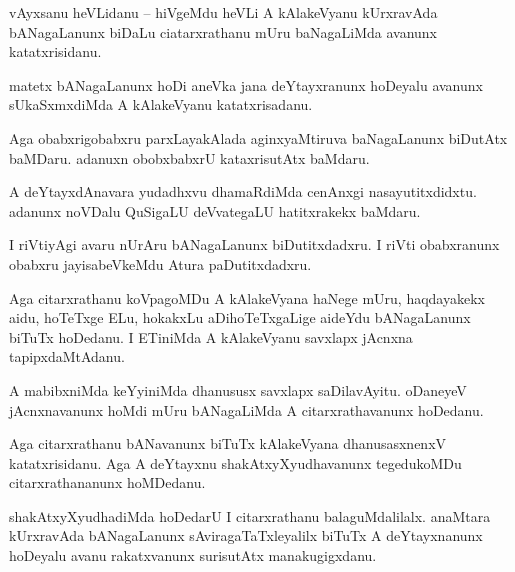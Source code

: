 \documentclass{article}
\begin{document}
\begin{mng}%
vAyxsanu heVLidanu -- hiVgeMdu heVLi A kAlakeVyanu kUrxravAda bANagaLanunx biDaLu ciatarxrathanu 
mUru baNagaLiMda avanunx katatxrisidanu.
\end{mng}

\begin{mng}%
matetx bANagaLanunx hoDi aneVka jana deYtayxranunx hoDeyalu avanunx sUkaSxmxdiMda A kAlakeVyanu 
katatxrisadanu.
\end{mng}

\begin{mng}%
Aga obabxrigobabxru parxLayakAlada aginxyaMtiruva baNagaLanunx biDutAtx baMDaru. adanuxn 
obobxbabxrU kataxrisutAtx baMdaru.
\end{mng}

\begin{mng}%
A deYtayxdAnavara yudadhxvu dhamaRdiMda cenAnxgi nasayutitxdidxtu. adanunx noVDalu QuSigaLU 
deVvategaLU hatitxrakekx baMdaru.
\end{mng}

\begin{mng}%
I riVtiyAgi  avaru nUrAru bANagaLanunx biDutitxdadxru. I riVti obabxranunx obabxru jayisabeVkeMdu 
Atura paDutitxdadxru.
\end{mng}

\begin{mng}%
Aga citarxrathanu koVpagoMDu A kAlakeVyana haNege mUru, haqdayakekx aidu, hoTeTxge ELu, hokakxLu 
aDihoTeTxgaLige aideYdu bANagaLanunx biTuTx hoDedanu. I ETiniMda A kAlakeVyanu savxlapx jAcnxna 
tapipxdaMtAdanu.
\end{mng}

\begin{mng}%
A mabibxniMda keYyiniMda dhanususx savxlapx saDilavAyitu. oDaneyeV jAcnxnavanunx hoMdi mUru 
bANagaLiMda A citarxrathavanunx hoDedanu.
\end{mng}

\begin{mng}%
Aga citarxrathanu bANavanunx biTuTx kAlakeVyana dhanusasxnenxV katatxrisidanu. Aga A deYtayxnu 
shakAtxyXyudhavanunx tegedukoMDu citarxrathananunx hoMDedanu.
\end{mng}

\begin{mng}%
shakAtxyXyudhadiMda hoDedarU I citarxrathanu balaguMdalilalx. anaMtara kUrxravAda bANagaLanunx 
sAviragaTaTxleyalilx biTuTx A deYtayxnanunx hoDeyalu avanu rakatxvanunx surisutAtx manakugigxdanu.
\end{mng}
\end{document}
